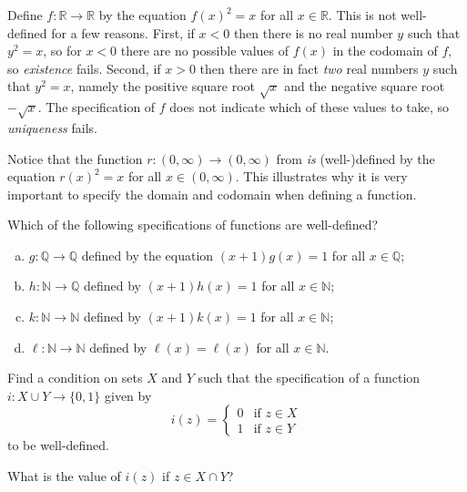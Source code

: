 \begin{example}
Define $f : \mathbb{R} \to \mathbb{R}$ by the equation $f(x)^2=x$ for all $x \in \mathbb{R}$. This is not well-defined for a few reasons. First, if $x<0$ then there is no real number $y$ such that $y^2=x$, so for $x<0$ there are no possible values of $f(x)$ in the codomain of $f$, so \textit{existence} fails. Second, if $x>0$ then there are in fact \textit{two} real numbers $y$ such that $y^2=x$, namely the positive square root $\sqrt{x}$ and the negative square root $-\sqrt{x}$. The specification of $f$ does not indicate which of these values to take, so \textit{uniqueness} fails.

Notice that the function $r : (0, \infty) \to (0, \infty)$ from  \textit{is} (well-)defined by the equation $r(x)^2 = x$ for all $x \in (0, \infty)$. This illustrates why it is very important to specify the domain and codomain when defining a function.
\end{example}

\begin{exercise}
Which of the following specifications of functions are well-defined?
\begin{enumerate}[(a)]
\item $g : \mathbb{Q} \to \mathbb{Q}$ defined by the equation $(x+1)g(x)=1$ for all $x \in \mathbb{Q}$;
\item $h : \mathbb{N} \to \mathbb{Q}$ defined by $(x+1)h(x)=1$ for all $x \in \mathbb{N}$;
\item $k : \mathbb{N} \to \mathbb{N}$ defined by $(x+1)k(x)=1$ for all $x \in \mathbb{N}$;
\item $\ell : \mathbb{N} \to \mathbb{N}$ defined by $\ell(x)=\ell(x)$ for all $x \in \mathbb{N}$.
\end{enumerate}
\end{exercise}

\begin{exercise}
\label{exWellDefinednessOfFunctionOnUnion}
Find a condition on sets $X$ and $Y$ such that the specification of a function $i : X \cup Y \to \{ 0, 1 \}$ given by
\[ i(z) = \begin{cases} 0 & \text{if } z \in X \\ 1 & \text{if } z \in Y \end{cases} \]
to be well-defined.
\begin{backhint}
What is the value of $i(z)$ if $z \in X \cap Y$?
\end{backhint}
\end{exercise}

